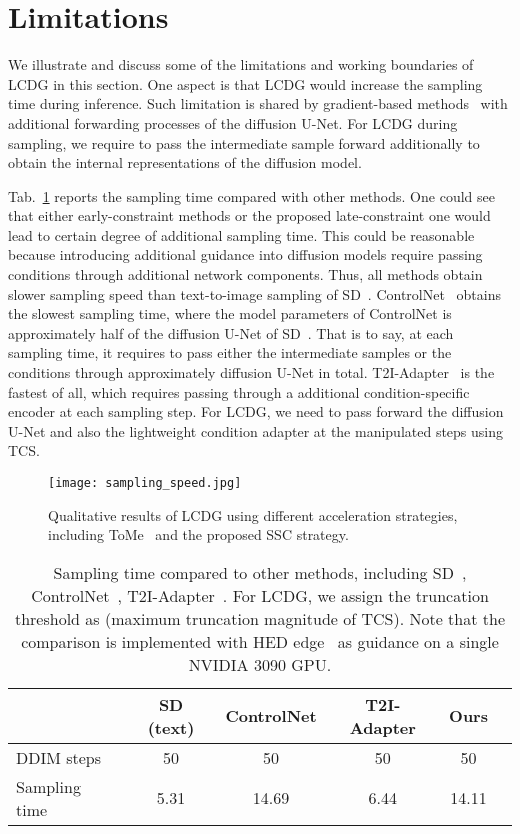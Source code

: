 \documentclass{article}
\begin{document}
\section{Limitations}
\label{limitations}

We illustrate and discuss some of the limitations and working boundaries of LCDG in this section. One aspect is that LCDG would increase the sampling time during inference. Such limitation is shared by gradient-based methods~\cite{dhariwal2021diffusion,ho2022classifier} with additional forwarding processes of the diffusion U-Net. For LCDG during sampling, we require to pass the intermediate sample forward additionally to obtain the internal representations of the diffusion model. 



Tab.~\ref{table:sampling time} reports the sampling time compared with other methods. One could see that either early-constraint methods or the proposed late-constraint one would lead to certain degree of additional sampling time. This could be reasonable because introducing additional guidance into diffusion models require passing conditions through additional network components. Thus, all methods obtain slower sampling speed than text-to-image sampling of SD~\cite{rombach2022high}. ControlNet~\cite{zhang2023adding} obtains the slowest sampling time, where the model parameters of ControlNet is approximately half of the diffusion U-Net of SD~\cite{rombach2022high}. That is to say, at each sampling time, it requires to pass either the intermediate samples or the conditions through approximately  diffusion U-Net in total. T2I-Adapter~\cite{mou2023t2i} is the fastest of all, which requires passing through a additional condition-specific encoder at each sampling step. For LCDG, we need to pass  forward the diffusion U-Net and also the lightweight condition adapter at the manipulated steps using TCS.

\begin{figure*}[t!]
  \centering
  \texttt{[image: sampling\_speed.jpg]} \caption{Qualitative results of LCDG using different acceleration strategies, including ToMe~\cite{bolya2022token} and the proposed SSC strategy.}
  \label{figure:sampling speed}
  \end{figure*}

\begin{table}[h]
  \centering
\caption{Sampling time compared to other methods, including SD~\cite{rombach2022high}, ControlNet~\cite{zhang2023adding}, T2I-Adapter~\cite{mou2023t2i}. For LCDG, we assign the truncation threshold as  (maximum truncation magnitude of TCS). Note that the comparison is implemented with HED edge~\cite{xie2015holistically} as guidance on a single NVIDIA 3090 GPU.}
\begin{tabular}{lccccc}
   \toprule
   &SD (text)&ControlNet&T2I-Adapter&Ours\\
   \midrule 
   DDIM steps    & 50 & 50 & 50 & 50 \\
   Sampling time    & 5.31 & 14.69 & 6.44 & 14.11 \\
\bottomrule
\end{tabular}
  \label{table:sampling time}
\end{table}
\end{document}
